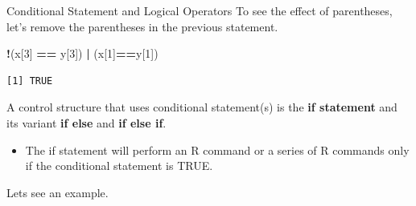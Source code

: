 \documentclass[
  ignorenonframetext,
]{beamer}
\newenvironment{Shaded}{\begin{snugshade}}{\end{snugshade}}
\newcommand{\DecValTok}[1]{\textcolor[rgb]{0.00,0.00,0.81}{#1}}
\newcommand{\NormalTok}[1]{#1}
\newcommand{\SpecialCharTok}[1]{\textcolor[rgb]{0.81,0.36,0.00}{\textbf{#1}}}
\providecommand{\tightlist}{%
  \setlength{\itemsep}{0pt}\setlength{\parskip}{0pt}}
\begin{document}
\begin{frame}[fragile]{Conditional Statement and Logical Operators}
\protect\hypertarget{conditional-statement-and-logical-operators-2}{}
To see the effect of parentheses, let's remove the parentheses in the
previous statement. \small

\begin{Shaded}
\begin{Highlighting}[]
\SpecialCharTok{!}\NormalTok{(x[}\DecValTok{3}\NormalTok{] }\SpecialCharTok{==}\NormalTok{ y[}\DecValTok{3}\NormalTok{]) }\SpecialCharTok{|}\NormalTok{ (x[}\DecValTok{1}\NormalTok{]}\SpecialCharTok{==}\NormalTok{y[}\DecValTok{1}\NormalTok{])}
\end{Highlighting}
\end{Shaded}

\begin{verbatim}
[1] TRUE
\end{verbatim}

\normalsize

A control structure that uses conditional statement(s) is the \textbf{if
statement} and its variant \textbf{if else} and \textbf{if else if}.

\begin{itemize}
\tightlist
\item
  The if statement will perform an R command or a series of R commands
  only if the conditional statement is TRUE.
\end{itemize}

Lets see an example.
\end{frame}
\end{document}
